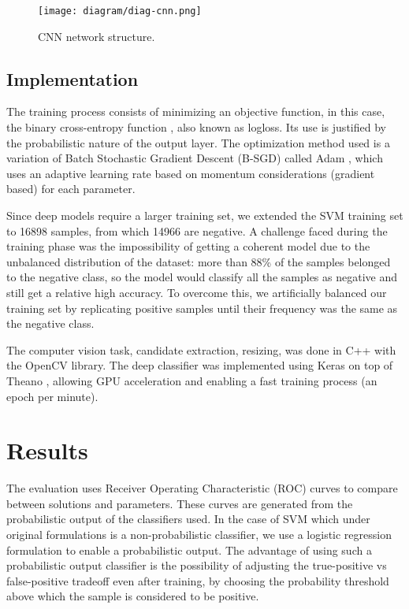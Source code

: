         \begin{figure}
        \centering
        \texttt{[image: diagram/diag-cnn.png]}
        \caption{CNN network structure.}
        \label{fig:diag-cnn}
        \end{figure}

    \subsection{Implementation}
        The training process consists of minimizing an objective function, in this case, the binary cross-entropy function \cite{DLbook}, also known as logloss. Its use is justified by the probabilistic nature of the output layer. The optimization method used is a variation of Batch Stochastic Gradient Descent (B-SGD) called Adam \cite{kingma2014adam}, which uses an adaptive learning rate based on momentum considerations (gradient based) for each parameter.

        Since deep models require a larger training set, we extended the SVM training set to 16898 samples, from which 14966 are negative. A challenge faced during the training phase was the impossibility of getting a coherent model due to the unbalanced distribution of the dataset: more than 88\% of the samples belonged to the negative class, so the model would classify all the samples as negative and still get a relative high accuracy. To overcome this, we artificially balanced our training set by replicating positive samples until their frequency was the same as the negative class.

        The computer vision task, candidate extraction, resizing, was done in C++ with the OpenCV library. The deep classifier was implemented using Keras \cite{keras} on top of Theano \cite{theano}, allowing GPU acceleration and enabling a fast training process (an epoch per minute).


\section{Results}
\label{sec:results}

    The evaluation uses Receiver Operating Characteristic (ROC) curves \cite{evaluationMetrics} to compare between solutions and parameters. These curves are generated from the probabilistic output of the classifiers used. In the case of SVM which under original formulations is a non-probabilistic classifier, we use a logistic regression formulation \cite{svmProbabilisticOutput} to enable a probabilistic output. The advantage of using such a probabilistic output classifier is the possibility of adjusting the true-positive vs false-positive tradeoff even after training, by choosing the probability threshold above which the sample is considered to be positive.


